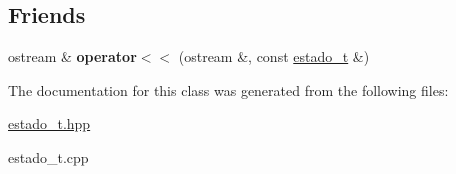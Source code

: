 \subsection*{Friends}
\begin{DoxyCompactItemize}
\item 
\hypertarget{classestado__t_aaf453bdc9256452e29049bc6dc10ec3a}{}\label{classestado__t_aaf453bdc9256452e29049bc6dc10ec3a} 
ostream \& {\bfseries operator$<$$<$} (ostream \&, const \hyperlink{classestado__t}{estado\+\_\+t} \&)
\end{DoxyCompactItemize}


The documentation for this class was generated from the following files\+:\begin{DoxyCompactItemize}
\item 
\hyperlink{estado__t_8hpp}{estado\+\_\+t.\+hpp}\item 
estado\+\_\+t.\+cpp\end{DoxyCompactItemize}

